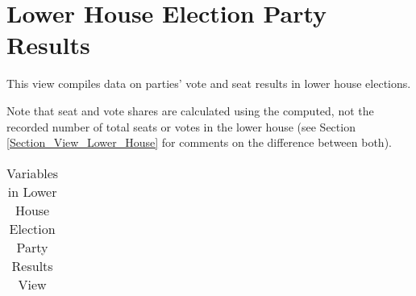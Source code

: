 \section{Lower House Election Party Results}\label{sec_lh_election_party_results}
This view compiles data on parties' vote and seat results in lower house elections.

Note that seat and vote shares are calculated using the computed, not the recorded number of total seats or votes in the lower house (see Section \ref{Section_View_Lower_House} for comments on the difference between both).
\begin{center}
\begin{longtable}{L{4cm} L{6cm} L{3cm}}
\caption{Variables in Lower House Election Party Results View\label{tab_lh_election_party_results}}


\end{longtable}
\end{center}
